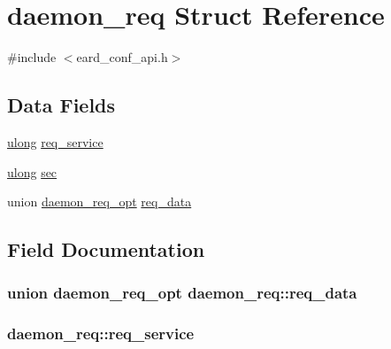 \hypertarget{structdaemon__req}{}\section{daemon\+\_\+req Struct Reference}
\label{structdaemon__req}


{\ttfamily \#include $<$eard\+\_\+conf\+\_\+api.\+h$>$}

\subsection*{Data Fields}
\begin{DoxyCompactItemize}
\item 
\hyperlink{generic_8h_a718b4eb2652c286f4d42dc18a8e71a1a}{ulong} \hyperlink{structdaemon__req_aa59ae5013716ad0bba2f85a87c23034c}{req\+\_\+service}
\item 
\hyperlink{generic_8h_a718b4eb2652c286f4d42dc18a8e71a1a}{ulong} \hyperlink{structdaemon__req_a113e5a11da1ed10af890b01c7c487342}{sec}
\item 
union \hyperlink{uniondaemon__req__opt}{daemon\+\_\+req\+\_\+opt} \hyperlink{structdaemon__req_a5f08bab0c4d658345f6438c8c7018780}{req\+\_\+data}
\end{DoxyCompactItemize}


\subsection{Field Documentation}
\subsubsection[{\texorpdfstring{req\+\_\+data}{req_data}}]{\setlength{\rightskip}{0pt plus 5cm}union {\bf daemon\+\_\+req\+\_\+opt} daemon\+\_\+req\+::req\+\_\+data}\hypertarget{structdaemon__req_a5f08bab0c4d658345f6438c8c7018780}{}\label{structdaemon__req_a5f08bab0c4d658345f6438c8c7018780}
\subsubsection[{\texorpdfstring{req\+\_\+service}{req_service}}]{ daemon\+\_\+req\+::req\+\_\+service}\hypertarget{structdaemon__req_aa59ae5013716ad0bba2f85a87c23034c}{}\label{structdaemon__req_aa59ae5013716ad0bba2f85a87c23034c}
